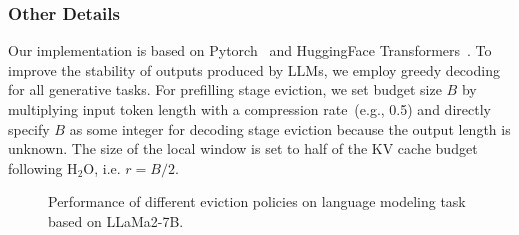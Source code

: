 \subsubsection{Other Details}
Our implementation is based on Pytorch~\cite{pytorch} and HuggingFace Transformers~\cite{wolf-etal-2020-transformers}. To improve the stability of outputs produced by LLMs, we employ greedy decoding for all generative tasks. For prefilling stage eviction, we set budget size $B$ by multiplying input token length with a compression rate~(e.g., 0.5) and directly specify $B$ as some integer for decoding stage eviction because the output length is unknown. The size of the local window is set to half of the KV cache budget following H$_{\text{2}}$O, i.e. $r=B/2$.
\begin{figure}[t]
	\centering
    \caption{Performance of different eviction policies on language modeling task based on LLaMa2-7B.}
	\label{fig:ppl}
\end{figure}
